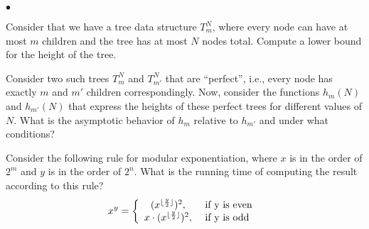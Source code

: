 \documentclass{article}
\newenvironment{myitem}{\begin{list}{$\bullet$}
{\setlength{\itemsep}{-0pt}
\setlength{\topsep}{0pt}
\setlength{\labelwidth}{0pt}
\setlength{\leftmargin}{10pt}
\setlength{\parsep}{-0pt}
\setlength{\itemsep}{0pt}
\setlength{\partopsep}{0pt}}}%
{\end{list}}
\begin{document}
\begin{myitem}
\item Consider that we have a tree data structure $T_m^N$, where every
  node can have at most $m$ children and the tree has at most $N$
  nodes total. Compute a lower bound for the height of the tree.\\

\item Consider two such trees $T_m^N$ and $T_{m'}^N$ that are
  ``perfect'', i.e., every node has exactly $m$ and $m'$ children
  correspondingly. Now, consider the functions $h_m(N)$ and
  $h_{m'}(N)$ that express the heights of these perfect trees for
  different values of $N$. What is the asymptotic behavior of $h_m$
  relative to $h_{m'}$ and under what conditions?\\

\item Consider the following rule for modular exponentiation, where
  $x$ is in the order of $2^m$ and $y$ is in the order of $2^n$. What
  is the running time of computing the result according to this rule?
$$x^y = \left\{
\begin{array}{c l}     
    (x ^{\lfloor \frac{y}{2} \rfloor} )^2,  & \textrm{ if y is even }\\
    x \cdot (x^{\lfloor \frac{y}{2} \rfloor} )^2, & \textrm{ if y is odd}
\end{array}\right.$$
\end{myitem}
\end{document}
